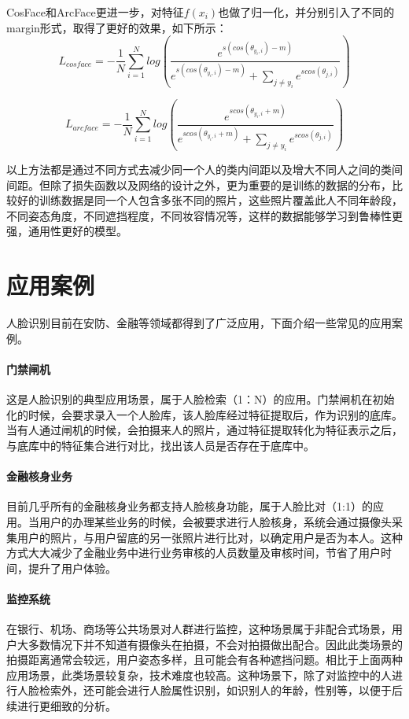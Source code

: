 CosFace和ArcFace更进一步，对特征$f(x_i)$也做了归一化，并分别引入了不同的margin形式，取得了更好的效果，如下所示：
\[L_{cosface}=-\frac{1}{N}\sum_{i=1}^{N}log(\frac{e^{s(cos(\theta_{y_i, i})-m)}}{e^{s(cos(\theta_{y_i, i})-m)} + \sum_{j \ne y_i} e^{s cos(\theta_{j,i})}})\]

\[L_{arcface}=-\frac{1}{N}\sum_{i=1}^{N}log(\frac{e^{s cos(\theta_{y_i, i} + m)}}{e^{s cos(\theta_{y_i, i} + m)} + \sum_{j \ne y_i} e^{s cos(\theta_{j,i})}})\]

以上方法都是通过不同方式去减少同一个人的类内间距以及增大不同人之间的类间间距。但除了损失函数以及网络的设计之外，更为重要的是训练的数据的分布，比较好的训练数据是同一个人包含多张不同的照片，这些照片覆盖此人不同年龄段，不同姿态角度，不同遮挡程度，不同妆容情况等，这样的数据能够学习到鲁棒性更强，通用性更好的模型。
\section{应用案例}

人脸识别目前在安防、金融等领域都得到了广泛应用，下面介绍一些常见的应用案例。
\paragraph{门禁闸机}
这是人脸识别的典型应用场景，属于人脸检索（1：N）的应用。门禁闸机在初始化的时候，会要求录入一个人脸库，该人脸库经过特征提取后，作为识别的底库。当有人通过闸机的时候，会拍摄来人的照片，通过特征提取转化为特征表示之后，与底库中的特征集合进行对比，找出该人员是否存在于底库中。
\paragraph{金融核身业务}
目前几乎所有的金融核身业务都支持人脸核身功能，属于人脸比对（1:1）的应用。当用户的办理某些业务的时候，会被要求进行人脸核身，系统会通过摄像头采集用户的照片，与用户留底的另一张照片进行比对，以确定用户是否为本人。这种方式大大减少了金融业务中进行业务审核的人员数量及审核时间，节省了用户时间，提升了用户体验。

\paragraph{监控系统}
在银行、机场、商场等公共场景对人群进行监控，这种场景属于非配合式场景，用户大多数情况下并不知道有摄像头在拍摄，不会对拍摄做出配合。因此此类场景的拍摄距离通常会较远，用户姿态多样，且可能会有各种遮挡问题。相比于上面两种应用场景，此类场景较复杂，技术难度也较高。这种场景下，除了对监控中的人进行人脸检索外，还可能会进行人脸属性识别，如识别人的年龄，性别等，以便于后续进行更细致的分析。